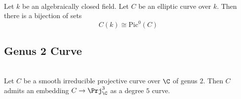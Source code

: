 \documentclass[a4paper]{article}
\begin{document}
\begin{prp}{}{}\\
Let $k$ be an algebraically closed field. Let $C$ be an elliptic curve over $k$. Then there is a bijection of sets $$C(k)\cong\text{Pic}^0(C)$$
\end{prp}

\subsection{Genus 2 Curve}
\begin{prp}{}{}\\
Let $C$ be a smooth irreducible projective curve over $\C$ of genus $2$. Then $C$ admits an embedding $C\to\Prj_\C^3$ as a degree $5$ curve. 
\end{prp}
\end{document}
